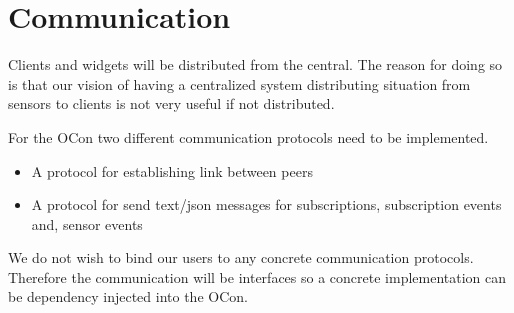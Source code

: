 \documentclass[../report.tex]{subfiles}
\begin{document}
\section{Communication}

Clients and widgets will be distributed from the central. The reason for doing so is that our vision of having a centralized system distributing situation from sensors to clients is not very useful if not distributed.

For the OCon two different communication protocols need to be implemented.\\

\begin{itemize}
    \item A protocol for establishing link between peers
    \item A protocol for send text/json messages for subscriptions, subscription events and, sensor events \\
\end{itemize}

We do not wish to bind our users to any concrete communication protocols. Therefore the communication will be interfaces so a concrete implementation can be dependency injected into the OCon.
\end{document}
